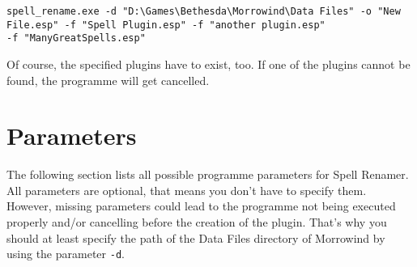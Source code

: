 \documentclass[12pt,oneside,a4paper]{article}
\begin{document}
\texttt{spell\_rename.exe -d "D:\textbackslash{}Games\textbackslash{}Bethesda\textbackslash{}Morrowind\textbackslash{}Data Files" -o "New File.esp" -f "Spell Plugin.esp" -f "another plugin.esp" \\-f "ManyGreatSpells.esp"}

Of course, the specified plugins have to exist, too.
If one of the plugins cannot be found, the programme will get cancelled.

\section{Parameters}
The following section lists all possible programme parameters for Spell Renamer.
All parameters are optional, that means you don't have to specify them.
However, missing parameters could lead to the programme not being executed
properly and\slash or cancelling before the creation of the plugin.
That's why you should at least specify the path of the Data Files directory of
Morrowind by using the parameter \texttt{-d}.
\newline
\end{document}
